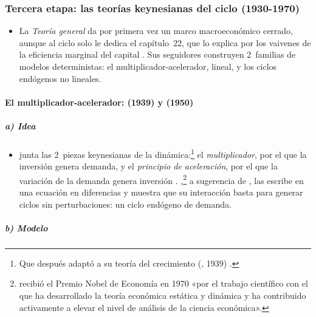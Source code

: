 \documentclass[11pt]{article}
\begin{document}
\subsubsection{Tercera etapa: las teorías keynesianas del ciclo (1930-1970)}\label{sec:keynesianas}

\begin{itemize}
\item La \emph{Teoría general} da por primera vez un marco macroeconómico cerrado, aunque al ciclo solo le dedica el capítulo~22, que lo explica por los vaivenes de la eficiencia marginal del capital\nocite{Keynes1936} . Sus seguidores construyen 2~familias de modelos deterministas: el multiplicador-acelerador, lineal, y los ciclos endógenos no lineales.
\end{itemize}

\paragraph{El multiplicador-acelerador:  (1939) y  (1950)}

\subparagraph{a) Idea}

\begin{itemize}
\item \textcite{Harrod1936Trade} junta las 2~piezas keynesianas de la dinámica:\footnote{Que después adaptó a su teoría del crecimiento (, 1939) .} el \emph{multiplicador}, por el que la inversión genera demanda, y el \emph{principio de aceleración}, por el que la variación de la demanda genera inversión . \textcite{Samuelson1939Interactions},\footnote{ recibió el Premio Nobel de Economía en 1970 «por el trabajo científico con el que ha desarrollado la teoría económica estática y dinámica y ha contribuido activamente a elevar el nivel de análisis de la ciencia económica»\nocite{Nobel1970Samuelson}.} a sugerencia de , las escribe en una ecuación en diferencias y muestra que su interacción basta para generar ciclos sin perturbaciones: un ciclo endógeno de demanda.
\end{itemize}

\subparagraph{b) Modelo}
\end{document}
